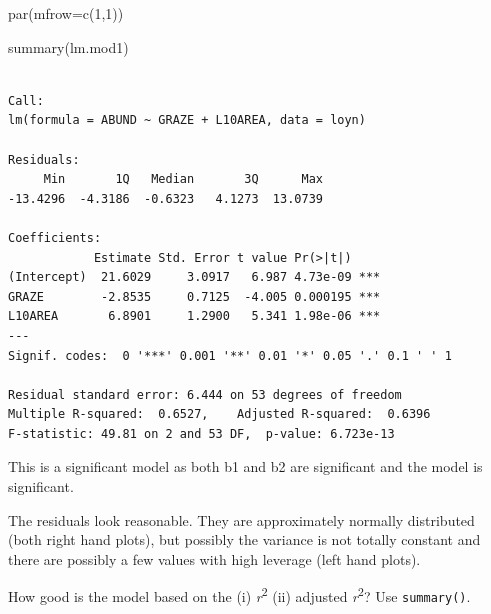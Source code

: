 \documentclass[
  10pt,
  letterpaper,
  DIV=11,
  numbers=noendperiod]{scrartcl}
\newenvironment{Shaded}{\begin{snugshade}}{\end{snugshade}}
\newcommand{\AttributeTok}[1]{\textcolor[rgb]{0.40,0.45,0.13}{#1}}
\newcommand{\DecValTok}[1]{\textcolor[rgb]{0.68,0.00,0.00}{#1}}
\newcommand{\FunctionTok}[1]{\textcolor[rgb]{0.28,0.35,0.67}{#1}}
\newcommand{\NormalTok}[1]{\textcolor[rgb]{0.00,0.23,0.31}{#1}}
\begin{document}
\begin{Shaded}
\begin{Highlighting}[]
\FunctionTok{par}\NormalTok{(}\AttributeTok{mfrow=}\FunctionTok{c}\NormalTok{(}\DecValTok{1}\NormalTok{,}\DecValTok{1}\NormalTok{))}

\FunctionTok{summary}\NormalTok{(lm.mod1)}
\end{Highlighting}
\end{Shaded}

\begin{verbatim}

Call:
lm(formula = ABUND ~ GRAZE + L10AREA, data = loyn)

Residuals:
     Min       1Q   Median       3Q      Max 
-13.4296  -4.3186  -0.6323   4.1273  13.0739 

Coefficients:
            Estimate Std. Error t value Pr(>|t|)    
(Intercept)  21.6029     3.0917   6.987 4.73e-09 ***
GRAZE        -2.8535     0.7125  -4.005 0.000195 ***
L10AREA       6.8901     1.2900   5.341 1.98e-06 ***
---
Signif. codes:  0 '***' 0.001 '**' 0.01 '*' 0.05 '.' 0.1 ' ' 1

Residual standard error: 6.444 on 53 degrees of freedom
Multiple R-squared:  0.6527,    Adjusted R-squared:  0.6396 
F-statistic: 49.81 on 2 and 53 DF,  p-value: 6.723e-13
\end{verbatim}

This is a significant model as both b1 and b2 are significant and the
model is significant.

The residuals look reasonable. They are approximately normally
distributed (both right hand plots), but possibly the variance is not
totally constant and there are possibly a few values with high leverage
(left hand plots).

\begin{tcolorbox}[enhanced jigsaw, rightrule=.15mm, coltitle=black, leftrule=.75mm, titlerule=0mm, breakable, toprule=.15mm, bottomtitle=1mm, colback=white, toptitle=1mm, opacitybacktitle=0.6, bottomrule=.15mm, arc=.35mm, left=2mm, title=\textcolor{quarto-callout-warning-color}{\faExclamationTriangle}\hspace{0.5em}{Question 3}, colbacktitle=quarto-callout-warning-color!10!white, opacityback=0, colframe=quarto-callout-warning-color-frame]

How good is the model based on the (i) \emph{r}\textsuperscript{2} (ii)
adjusted \emph{r}\textsuperscript{2}? Use \texttt{summary()}.

\end{tcolorbox}
\end{document}
